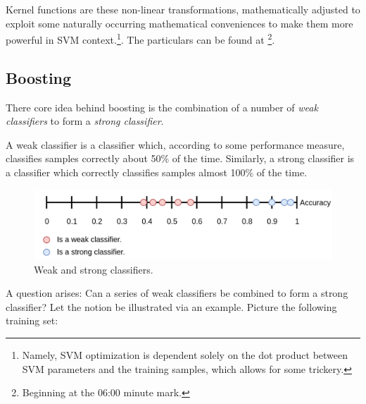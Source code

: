 \documentclass[a4paper, 12pt]{article}
\begin{document}
                        \par Kernel functions are these non-linear transformations, mathematically adjusted to exploit some naturally occurring mathematical conveniences to make them more powerful in SVM context.\footnote{Namely, SVM optimization is dependent solely on the dot product between SVM parameters and the training samples, which allows for some trickery.}. The particulars can be found at \cite{kernelMethods}\footnote{Beginning at the 06:00 minute mark.}.
                        
                        
                \newpage                  
                \subsection{Boosting}
                
                    \par There core idea behind boosting is the combination of a number of \textit{weak classifiers} to form a \textit{strong classifier}.
                    
                    \par A weak classifier is a classifier which, according to some performance measure, classifies samples correctly about 50\% of the time. Similarly, a strong classifier is a classifier which correctly classifies samples almost 100\% of the time.
                    \begin{figure}[h]
                            \caption{Weak and strong classifiers.}
                            \centering
                            \includegraphics[width=\textwidth]{weakStrongClassifiers}
                    \end{figure} 
                    
                    \newpage
                    
                    \par A question arises: Can a series of weak classifiers be combined to form a strong classifier? Let the notion be illustrated via an example. Picture the following training set:
                    
\end{document}
